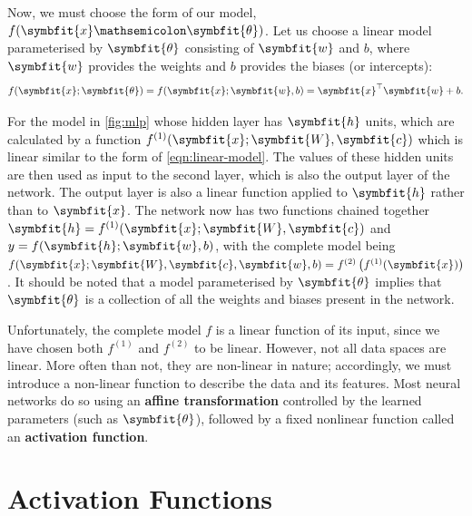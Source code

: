 Now, we must choose the form of our model, $f(\symbfit{x} \mathsemicolon \symbfit{\theta})$. Let us choose a linear model parameterised by $\symbfit{\theta}$ consisting of $\symbfit{w}$ and $b$, where $\symbfit{w}$ provides the weights and $b$ provides the biases (or intercepts):
\begin{equation}\label{eqn:linear-model}
    f(\symbfit{x}; \symbfit{\theta}) = f(\symbfit{x} ; \symbfit{w}, b)=\symbfit{x}^{\top} \symbfit{w} + b.
\end{equation}

For the model in \cref{fig:mlp} whose hidden layer has $\symbfit{h}$ units, which are calculated by a function \(f^{(1)}(\symbfit{x}; \symbfit{W}, \symbfit{c})\) which is linear similar to the form of \cref{eqn:linear-model}. 
The values of these hidden units are then used as input to the second layer, which is also the output layer of the network. The output layer is also a linear function applied to $\symbfit{h}$ rather than to $\symbfit{x}$.
The network now has two functions chained together \(\symbfit{h} = f^{(1)}(\symbfit{x}; \symbfit{W}, \symbfit{c})\) and \(y = f(\symbfit{h} ; \symbfit{w}, b)\), with the complete model being $f(\symbfit{x} ; \symbfit{W}, \symbfit{c}, \symbfit{w}, b)=f^{(2)}\left(f^{(1)}(\symbfit{x})\right)$. It should be noted that a model parameterised by $\symbfit{\theta}$ implies that $\symbfit{\theta}$ is a collection of all the weights and biases present in the network.

Unfortunately, the complete model $f$ is a linear function of its input, since we have chosen both $f^{(1)}$ and $f^{(2)}$ to be linear. 
However, not all data spaces are linear. More often than not, they are non-linear in nature; accordingly, we must introduce a non-linear function to describe the data and its features.
Most neural networks do so using an \textbf{affine transformation} controlled by the learned parameters (such as $\symbfit{\theta}$), followed by a fixed nonlinear function called an \textbf{activation function}.

\section{Activation Functions} \label{sec:activation-functions}

